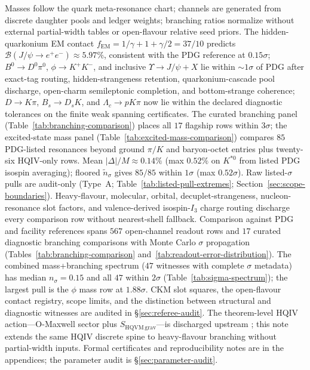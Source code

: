 \documentclass[11pt]{amsart}
\begin{document}
Masses follow the quark meta-resonance chart; channels are generated from discrete
daughter pools and ledger weights; branching ratios normalize without external
partial-width tables or open-flavour relative seed priors.
The hidden-quarkonium EM contact $f_{\mathrm{EM}}=1/\gamma+1+\gamma/2=37/10$ predicts
$\mathcal{B}(J/\psi\to e^+e^-)\approx 5.97\%$, consistent with the PDG reference
\cite{pdg2024,augustin1974} at $0.15\sigma$; $B^0\to D^0\pi^0$, $\phi\to K^+K^-$,
and inclusive $\Upsilon\to J/\psi+X$ lie within $\sim 1\sigma$ of PDG after
exact-tag routing, hidden-strangeness retention, quarkonium-cascade pool
discharge, open-charm semileptonic completion, and bottom-strange coherence;
$D\to K\pi$, $B_s\to D_sK$, and $\Lambda_c\to pK\pi$ now lie within the declared
diagnostic tolerances on the finite weak spanning certificates.
The curated branching panel (Table~\ref{tab:branching-comparison}) places all
$17$ flagship rows within $3\sigma$; the excited-state mass panel
(Table~\ref{tab:excited-mass-comparison}) compares $85$ PDG-listed resonances
beyond ground $\pi/K$ and baryon-octet entries plus twenty-six HQIV-only rows.
Mean $|\Delta|/M \approx 0.14\%$ (max $0.52\%$ on $K^{*0}$ from listed PDG isospin averaging);
floored $\tilde n_\sigma$ gives $85/85$ within $1\sigma$ (max $0.52\sigma$).
Raw listed-$\sigma$ pulls are audit-only (Type~A; Table~\ref{tab:listed-pull-extremes};
Section~\ref{sec:scope-boundaries}).
Heavy-flavour, molecular, orbital, decuplet-strangeness, nucleon-resonance slot
factors, and valence-derived isospin-$I_3$ charge routing discharge every comparison
row without nearest-shell fallback.
Comparison against PDG and facility references \cite{pdg2024,belle2002,cms2018}
spans $567$ open-channel readout rows and $17$ curated diagnostic branching
comparisons with Monte Carlo $\sigma$ propagation
(Tables~\ref{tab:branching-comparison} and~\ref{tab:readout-error-distribution}).
The combined mass+branching spectrum ($47$ witnesses with complete $\sigma$
metadata) has median $n_\sigma=0.15$ and all $47$ within $2\sigma$
(Table~\ref{tab:sigma-spectrum}); the largest pull is the $\phi$ mass row at
$1.88\sigma$.
CKM slot squares, the open-flavour contact registry, scope limits, and the
distinction between structural and diagnostic witnesses are audited in
\S\ref{sec:referee-audit}.
The theorem-level HQIV action---O-Maxwell sector plus $S_{\mathrm{HQVM\,grav}}$---is
discharged upstream \cite{hqiv-tuft-sm-lagrangian-paper}; this note extends the same
HQIV discrete spine to heavy-flavour branching without partial-width inputs.
Formal certificates and reproducibility notes are in the appendices; the parameter
audit is \S\ref{sec:parameter-audit}.
\end{document}
